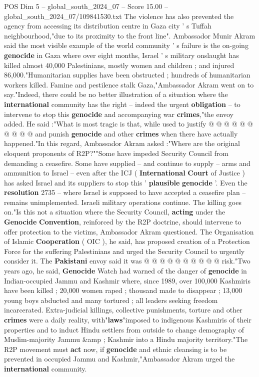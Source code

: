 \begin{textsample}{POS Dim 5 – global\_south\_2024\_07 – Score 15.00 – global\_south\_2024\_07/109841530.txt}
The violence has also prevented the agency from accessing its distribution centre in Gaza city ' s Tuffah neighbourhood,"due to its proximity to the front line".
Ambassador Munir Akram said the most visible example of the world community ' s failure is the on-going \textbf{genocide} in Gaza where over eight months, Israel ' s military onslaught has killed almost 40,000 Palestinians, mostly women and children ; and injured 86,000."Humanitarian supplies have been obstructed ; hundreds of humanitarian workers killed.
Famine and pestilence stalk Gaza,"Ambassador Akram went on to say."Indeed, there could be no better illustration of a situation where the \textbf{international} community has the right -- indeed the urgent \textbf{obligation} -- to intervene to stop this \textbf{genocide} and accompanying war \textbf{crimes},"the envoy added.
He said :"What is most tragic is that, while used to justify @ @ @ @ @ @ @ @ @ @ and punish \textbf{genocide} and other \textbf{crimes} when there have actually happened."In this regard, Ambassador Akram asked :"Where are the original eloquent proponents of R2P?""Some have impeded Security Council from demanding a ceasefire.
Some have supplied -- and continue to supply -- arms and ammunition to Israel -- even after the ICJ ( \textbf{International} \textbf{Court} of Justice ) has asked Israel and its suppliers to stop this ' \textbf{plausible} \textbf{genocide} '.
Even the \textbf{resolution} 2735 -- where Israel is supposed to have accepted a ceasefire plan -- remains unimplemented.
Israeli military operations continue.
The killing goes on."Is this not a situation where the Security Council, \textbf{acting} under the \textbf{Genocide} \textbf{Convention}, reinforced by the R2P doctrine, should intervene to offer protection to the victims, Ambassador Akram questioned.
The Organisation of Islamic \textbf{Cooperation} ( OIC ), he said, has proposed creation of a Protection Force for the suffering Palestinians and urged the Security Council to urgently consider it.
The \textbf{Pakistani} envoy said it was @ @ @ @ @ @ @ @ @ @ risk."Two years ago, he said, \textbf{Genocide} Watch had warned of the danger of \textbf{genocide} in Indian-occupied Jammu and Kashmir where, since 1989, over 100,000 Kashmiris have been killed ; 20,000 women raped ; thousand made to disappear ; 13,000 young boys abducted and many tortured ; all leaders seeking freedom incarcerated.
Extra-judicial killings, collective punishments, torture and other \textbf{crimes} were a daily reality, with"\textbf{laws}"imposed to indigenous Kashmiris of their properties and to induct Hindu settlers from outside to change demography of Muslim-majority Jammu \&amp ; Kashmir into a Hindu majority territory."The R2P movement must \textbf{act} now, if \textbf{genocide} and ethnic cleansing is to be prevented in occupied Jammu and Kashmir,"Ambassador Akram urged the \textbf{international} community.

\end{textsample}
